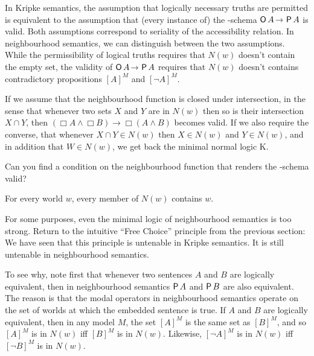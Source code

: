 In Kripke semantics, the assumption that logically necessary truths are
permitted is equivalent to the assumption that (every instance of) the
-schema $\Ob A \to \Pe A$ is valid. Both assumptions correspond to
seriality of the accessibility relation. In neighbourhood semantics, we can
distinguish between the two assumptions. While the permissibility of logical
truths requires that $N(w)$ doesn't contain the empty set, the validity of
$\Ob A \to \Pe A$ requires that $N(w)$ doesn't contains contradictory
propositions $[A]^M$ and $[\neg A]^M$.

If we assume that the neighbourhood function is closed under intersection, in
the sense that whenever two sets $X$ and $Y$ are in $N(w)$ then so is their
intersection $X\cap Y$, then $(\Box A \land \Box B) \to \Box (A \land B)$
becomes valid. If we also require the converse, that whenever $X\cap Y \in N(w)$
then $X \in N(w)$ and $Y\in N(w)$, and in addition that $W \in N(w)$, we get
back the minimal normal logic K.


\begin{exercise}
  Can you find a condition on the neighbourhood function that renders the
  -schema valid?
\end{exercise}
\begin{solution}
  For every world $w$, every member of $N(w)$ contains $w$.
\end{solution}

For some purposes, even the minimal logic of neighbourhood semantics is too
strong. Return to the intuitive ``Free Choice'' principle from the previous
section:
%
%
We have seen that this principle is untenable in Kripke semantics. It is
still untenable in neighbourhood semantics.

To see why, note first that whenever two sentences $A$ and $B$ are logically
equivalent, then in neighbourhood semantics $\operatorname{\mathsf{P}} A$ and $\operatorname{\mathsf{P}} B$ are also
equivalent. The reason is that the modal operators in neighbourhood semantics
operate on the set of worlds at which the embedded sentence is true. If $A$ and
$B$ are logically equivalent, then in any model $M$, the set $[A]^M$ is the same
set as $[B]^M$, and so $[A]^M$ is in $N(w)$ iff $[B]^M$ is in $N(w)$. Likewise,
$[\neg A]^M$ is in $N(w)$ iff $[\neg B]^M$ is in $N(w)$.

